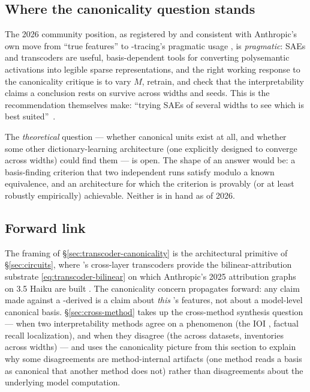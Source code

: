 \subsection{Where the canonicality question stands}
\label{sec:canonicality-frontier}

The 2026 community position, as registered by
\citet[\S 1]{leask2025-sae-not-canonical} and consistent with
Anthropic's own move from ``true features''
to -tracing's pragmatic  usage
, is
\emph{pragmatic}: SAEs and transcoders are useful, basis-dependent
tools for converting polysemantic activations into legible sparse
representations, and the right working response to the canonicality
critique is to vary $M$, retrain, and check that the
interpretability claims a conclusion rests on survive across widths and seeds. This is the
recommendation \citeauthor{leask2025-sae-not-canonical} themselves
make: ``trying SAEs of several widths to see which is best
suited''~\citep[\S 1]{leask2025-sae-not-canonical}.

The \emph{theoretical} question --- whether canonical units exist at
all, and whether some other dictionary-learning architecture (one
explicitly designed to converge across widths) could find them ---
is open. The shape of an answer would be: a basis-finding criterion
that two independent runs satisfy modulo a known equivalence, and an
architecture for which the criterion is provably (or at least
robustly empirically) achievable. Neither is in hand as of 2026.

\subsection{Forward link}
\label{sec:canonicality-forward}

The  framing of \S\ref{sec:transcoder-canonicality} is the
architectural primitive of \S\ref{sec:circuits}, where
\citet{lindsey2025-circuit-tracing}'s cross-layer transcoders provide
the bilinear-attribution substrate
\eqref{eq:transcoder-bilinear} on which Anthropic's 2025 attribution
graphs on  3.5 Haiku are built
. The
canonicality concern propagates forward: any  claim made
against a -derived  is a claim about
\emph{this} 's features, not about a model-level canonical
basis. \S\ref{sec:cross-method} takes up the cross-method synthesis
question --- when two interpretability methods agree on a phenomenon
(the IOI , factual recall localization), and when they
disagree (the  across datasets,   inventories
across widths) --- and uses the canonicality picture from this
section to explain why some disagreements are method-internal
artifacts (one method reads a basis as canonical that another method
does not) rather than disagreements about the underlying model
computation.
